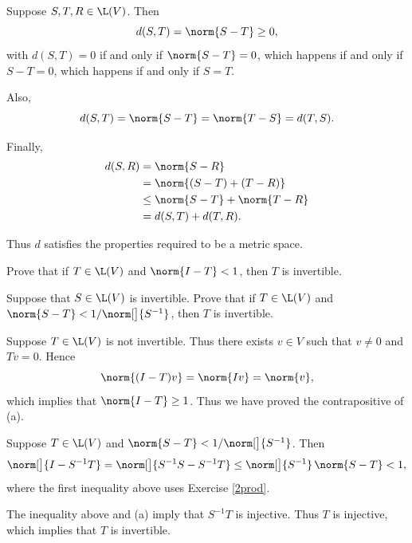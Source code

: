 \begin{Solution}
Suppose $S, T, R \in \L(V)$. Then
\[
d(S, T) = \norm{S-T} \ge 0,
\]
with $d(S, T) = 0$ if and only if $\norm{S-T} = 0$, which happens if and only if $S-T = 0$, which happens if and only if $S = T$.

Also,
\[
d(S,T) = \norm{S-T} = \norm{T-S} = d(T, S).
\]

Finally,
\begin{align*}
d(S, R) &= \norm{S-R} \\
&= \norm{(S-T) +(T - R)} \\
&\le \norm{S-T} + \norm{T-R} \\
&= d(S, T) + d(T, R).
\end{align*}

Thus $d$ satisfies the properties required to be a metric space.
\end{Solution}

\exercise
\begin{SUBtheorem}
\item
Prove that if $T \in \L(V)$ and $\norm{I - T} < 1$, then $T$ is invertible.
\item
Suppose that $S \in \L(V)$ is invertible. Prove that if $T \in \L(V)$ and $\norm{S - T} < 1/\norm[\big]{S^{-1}}$, then $T$ is invertible.
\end{SUBtheorem}

\begin{Solution}
\begin{subtheorem}
\item
Suppose $T \in \L(V)$ is not invertible. Thus there exists $v \in V$ such that $v \ne 0$ and $Tv = 0$. Hence
\[
\norm{(I - T) v} = \norm{Iv} = \norm{v},
\]
which implies that $\norm{I - T} \ge 1$. Thus we have proved the contrapositive of (a).

\item
Suppose $T \in \L(V)$ and $\norm{S - T} < 1/\norm[\big]{S^{-1}}$. Then
\[
\norm[\big]{ I - S^{-1} T } = \norm[\big]{ S^{-1} S - S^{-1} T } \le \norm[\big]{ S^{-1} } \, \norm{S - T} < 1,
\]
where the first inequality above uses Exercise \ref{2prod}.

The inequality above and (a) imply that $S^{-1} T$ is injective. Thus $T$ is injective, which implies that $T$ is invertible.
\end{subtheorem}
\end{Solution}

